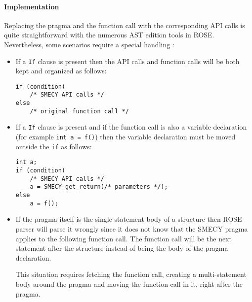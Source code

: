 \documentclass [A4]{article}
\begin{document}
	\paragraph{Implementation} Replacing the pragma and the function call with the corresponding API calls is quite straightforward with the numerous AST edition tools in ROSE. Nevertheless, some scenarios require a special handling :
	\begin{itemize}
		\item If a \verb+If+ clause is present then the API calls and function calls will be both kept and organized as follows:
		\begin{lstlisting}[frame=none, numbers=none]
if (condition)
	/* SMECY API calls */
else
	/* original function call */
		\end{lstlisting}
		\item If a \verb+If+ clause is present and if the function call is also a variable declaration (for example \verb+int a = f()+) then the variable declaration must be moved outside the \verb+if+ as follows:
		\begin{lstlisting}[frame=none, numbers=none]
int a;
if (condition)
	/* SMECY API calls */
	a = SMECY_get_return(/* parameters */);
else
	a = f();
		\end{lstlisting}
		\item If the pragma itself is the single-statement body of a structure then ROSE parser will parse it wrongly since it does not know that the SMECY pragma applies to the following function call. The function call will be the next statement after the structure instead of being the body of the pragma declaration. 
		
		This situation requires fetching the function call, creating a multi-statement body around the pragma and moving the function call in it, right after the pragma.
	\end{itemize}
	
\end{document}
